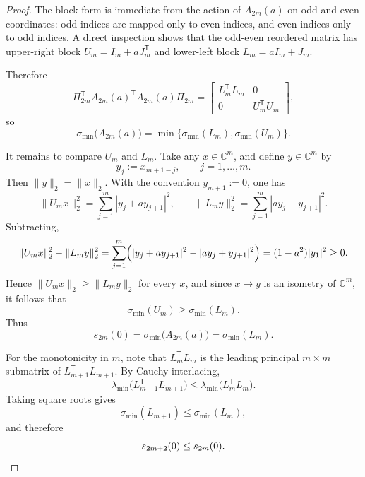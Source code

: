 \documentclass[11pt]{article}
\numberwithin{equation}{section}
\begin{document}
\begin{proof}
The block form is immediate from the action of \(A_{2m}(a)\) on odd and even
coordinates: odd indices are mapped only to even indices, and even indices only to
odd indices. A direct inspection shows that the odd-even reordered matrix has
upper-right block \(U_m=I_m+aJ_m^{\mathsf T}\) and lower-left block
\(L_m=aI_m+J_m\).

Therefore
\[
\Pi_{2m}^{\mathsf T}A_{2m}(a)^{\mathsf T}A_{2m}(a)\Pi_{2m}
=
\begin{bmatrix}
L_m^{\mathsf T}L_m & 0\\
0 & U_m^{\mathsf T}U_m
\end{bmatrix},
\]
so
\[
\sigma_{\min}\!\bigl(A_{2m}(a)\bigr)
=
\min\{\sigma_{\min}(L_m),\sigma_{\min}(U_m)\}.
\]

It remains to compare \(U_m\) and \(L_m\). Take any \(x\in\mathbb C^m\), and define
\(y\in\mathbb C^m\) by
\[
y_j:=x_{m+1-j},\qquad j=1,\dots,m.
\]
Then \(\|y\|_2=\|x\|_2\). With the convention \(y_{m+1}:=0\), one has
\[
\|U_mx\|_2^2=\sum_{j=1}^m |y_j+a y_{j+1}|^2,
\qquad
\|L_my\|_2^2=\sum_{j=1}^m |a y_j+y_{j+1}|^2.
\]
Subtracting,
\[
\|U_mx\|_2^2-\|L_my\|_2^2
=
\sum_{j=1}^m\Bigl(|y_j+a y_{j+1}|^2-|a y_j+y_{j+1}|^2\Bigr)
=
(1-a^2)|y_1|^2\ge 0.
\]
Hence \(\|U_mx\|_2\ge \|L_my\|_2\) for every \(x\), and since \(x\mapsto y\) is an
isometry of \(\mathbb C^m\), it follows that
\[
\sigma_{\min}(U_m)\ge \sigma_{\min}(L_m).
\]
Thus
\[
s_{2m}(0)=\sigma_{\min}\!\bigl(A_{2m}(a)\bigr)=\sigma_{\min}(L_m).
\]

For the monotonicity in \(m\), note that \(L_m^{\mathsf T}L_m\) is the leading principal
\(m\times m\) submatrix of \(L_{m+1}^{\mathsf T}L_{m+1}\). By Cauchy interlacing,
\[
\lambda_{\min}\!\bigl(L_{m+1}^{\mathsf T}L_{m+1}\bigr)
\le
\lambda_{\min}\!\bigl(L_m^{\mathsf T}L_m\bigr).
\]
Taking square roots gives
\[
\sigma_{\min}(L_{m+1})\le \sigma_{\min}(L_m),
\]
and therefore
\[
s_{2m+2}(0)\le s_{2m}(0).
\qedhere
\]
\end{proof}
\end{document}

